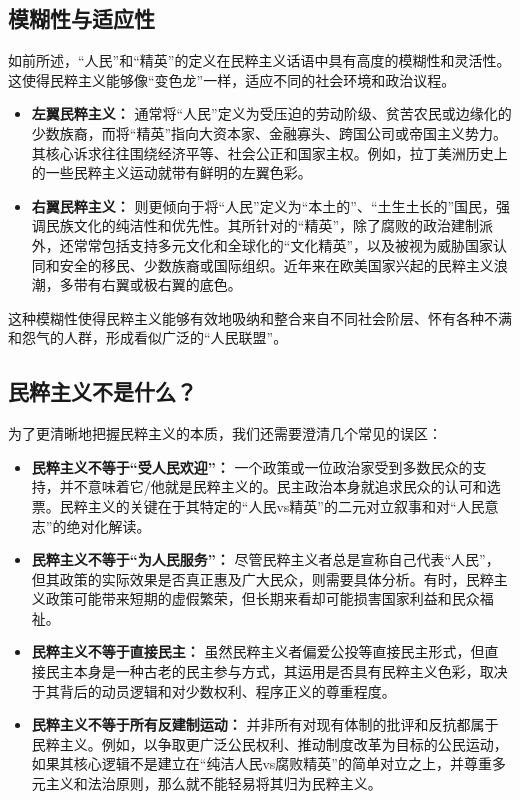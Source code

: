 \documentclass[UTF8, 10pt]{ctexbook}
\begin{document}
\subsection{模糊性与适应性}
如前所述，“人民”和“精英”的定义在民粹主义话语中具有高度的模糊性和灵活性。这使得民粹主义能够像“变色龙”一样，适应不同的社会环境和政治议程。
    \begin{itemize}
        \item \textbf{左翼民粹主义：} 通常将“人民”定义为受压迫的劳动阶级、贫苦农民或边缘化的少数族裔，而将“精英”指向大资本家、金融寡头、跨国公司或帝国主义势力。其核心诉求往往围绕经济平等、社会公正和国家主权。例如，拉丁美洲历史上的一些民粹主义运动就带有鲜明的左翼色彩。
        \item \textbf{右翼民粹主义：} 则更倾向于将“人民”定义为“本土的”、“土生土长的”国民，强调民族文化的纯洁性和优先性。其所针对的“精英”，除了腐败的政治建制派外，还常常包括支持多元文化和全球化的“文化精英”，以及被视为威胁国家认同和安全的移民、少数族裔或国际组织。近年来在欧美国家兴起的民粹主义浪潮，多带有右翼或极右翼的底色。
    \end{itemize}

这种模糊性使得民粹主义能够有效地吸纳和整合来自不同社会阶层、怀有各种不满和怨气的人群，形成看似广泛的“人民联盟”。

\subsection{民粹主义不是什么？}
为了更清晰地把握民粹主义的本质，我们还需要澄清几个常见的误区：
    \begin{itemize}
        \item \textbf{民粹主义不等于“受人民欢迎”：} 一个政策或一位政治家受到多数民众的支持，并不意味着它/他就是民粹主义的。民主政治本身就追求民众的认可和选票。民粹主义的关键在于其特定的“人民vs精英”的二元对立叙事和对“人民意志”的绝对化解读。
        \item \textbf{民粹主义不等于“为人民服务”：} 尽管民粹主义者总是宣称自己代表“人民”，但其政策的实际效果是否真正惠及广大民众，则需要具体分析。有时，民粹主义政策可能带来短期的虚假繁荣，但长期来看却可能损害国家利益和民众福祉。
        \item \textbf{民粹主义不等于直接民主：} 虽然民粹主义者偏爱公投等直接民主形式，但直接民主本身是一种古老的民主参与方式，其运用是否具有民粹主义色彩，取决于其背后的动员逻辑和对少数权利、程序正义的尊重程度。
        \item \textbf{民粹主义不等于所有反建制运动：} 并非所有对现有体制的批评和反抗都属于民粹主义。例如，以争取更广泛公民权利、推动制度改革为目标的公民运动，如果其核心逻辑不是建立在“纯洁人民vs腐败精英”的简单对立之上，并尊重多元主义和法治原则，那么就不能轻易将其归为民粹主义。
    \end{itemize}
\end{document}
